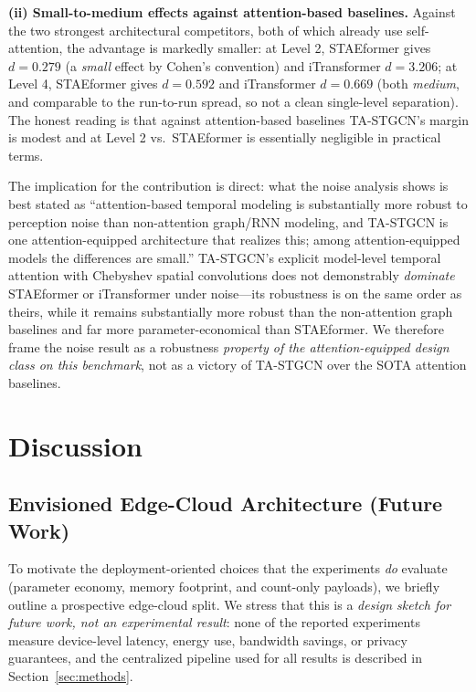 \documentclass[journal,twocolumn]{IEEEtran}
\begin{document}
\textbf{(ii) Small-to-medium effects against attention-based baselines.} Against the two strongest architectural competitors, both of which already use self-attention, the advantage is markedly smaller: at Level 2, STAEformer gives $d = 0.279$ (a \emph{small} effect by Cohen's convention) and iTransformer $d = 3.206$; at Level 4, STAEformer gives $d = 0.592$ and iTransformer $d = 0.669$ (both \emph{medium}, and comparable to the run-to-run spread, so not a clean single-level separation). The honest reading is that against attention-based baselines TA-STGCN's margin is modest and at Level 2 vs.\ STAEformer is essentially negligible in practical terms.

The implication for the contribution is direct: what the noise analysis shows is best stated as ``attention-based temporal modeling is substantially more robust to perception noise than non-attention graph/RNN modeling, and TA-STGCN is one attention-equipped architecture that realizes this; among attention-equipped models the differences are small.'' TA-STGCN's explicit model-level temporal attention with Chebyshev spatial convolutions does not demonstrably \emph{dominate} STAEformer or iTransformer under noise---its robustness is on the same order as theirs, while it remains substantially more robust than the non-attention graph baselines and far more parameter-economical than STAEformer. We therefore frame the noise result as a robustness \emph{property of the attention-equipped design class on this benchmark}, not as a victory of TA-STGCN over the SOTA attention baselines.

\section{Discussion}
\label{sec:deployment_limitations}

\subsection{Envisioned Edge-Cloud Architecture (Future Work)}
\label{sec:deployment_arch}

To motivate the deployment-oriented choices that the experiments \emph{do} evaluate (parameter economy, memory footprint, and count-only payloads), we briefly outline a prospective edge-cloud split. We stress that this is a \emph{design sketch for future work, not an experimental result}: none of the reported experiments measure device-level latency, energy use, bandwidth savings, or privacy guarantees, and the centralized pipeline used for all results is described in Section~\ref{sec:methods}.
\end{document}
